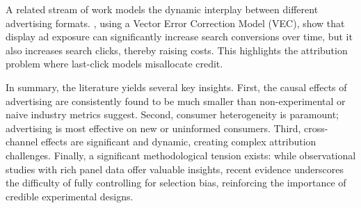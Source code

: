 A related stream of work models the dynamic interplay between different advertising formats. \citet{kireyev2016do}, using a Vector Error Correction Model (VEC), show that display ad exposure can significantly increase search conversions over time, but it also increases search clicks, thereby raising costs. This highlights the attribution problem where last-click models misallocate credit.

In summary, the literature yields several key insights. First, the causal effects of advertising are consistently found to be much smaller than non-experimental or naive industry metrics suggest. Second, consumer heterogeneity is paramount; advertising is most effective on new or uninformed consumers. Third, cross-channel effects are significant and dynamic, creating complex attribution challenges. Finally, a significant methodological tension exists: while observational studies with rich panel data offer valuable insights, recent evidence underscores the difficulty of fully controlling for selection bias, reinforcing the importance of credible experimental designs. 
